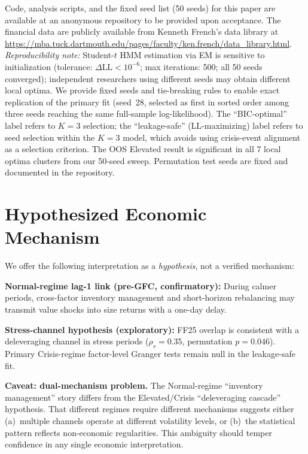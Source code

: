 \documentclass[sigconf,anonymous]{acmart}
\begin{document}
Code, analysis scripts, and the fixed seed list (50 seeds) for this paper are available at an anonymous repository to be provided upon acceptance. The financial data are publicly available from Kenneth French's data library at \url{https://mba.tuck.dartmouth.edu/pages/faculty/ken.french/data_library.html}. \emph{Reproducibility note:} Student-$t$ HMM estimation via EM is sensitive to initialization (tolerance: $\Delta\text{LL} < 10^{-6}$; max iterations: 500; all 50 seeds converged); independent researchers using different seeds may obtain different local optima. We provide fixed seeds and tie-breaking rules to enable exact replication of the primary fit (seed~28, selected as first in sorted order among three seeds reaching the same full-sample log-likelihood). The ``BIC-optimal'' label refers to $K = 3$ selection; the ``leakage-safe'' (LL-maximizing) label refers to seed selection within the $K = 3$ model, which avoids using crisis-event alignment as a selection criterion. The OOS Elevated result is significant in all 7 local optima clusters from our 50-seed sweep. Permutation test seeds are fixed and documented in the repository.

\appendix

\section{Hypothesized Economic Mechanism}
\label{app:mechanism}

We offer the following interpretation as a \emph{hypothesis}, not a verified mechanism:

\textbf{Normal-regime lag-1 link (pre-GFC, confirmatory):} During calmer periods,
cross-factor inventory management and short-horizon rebalancing may transmit
value shocks into size returns with a one-day delay.

\textbf{Stress-channel hypothesis (exploratory):} FF25 overlap is consistent with
a deleveraging channel in stress periods
($\rho_s = 0.35$, permutation $p = 0.046$). Primary Crisis-regime factor-level
Granger tests remain null in the leakage-safe fit.

\textbf{Caveat: dual-mechanism problem.} The Normal-regime ``inventory management''
story differs from the Elevated/Crisis ``deleveraging cascade'' hypothesis.
That different regimes require different mechanisms suggests either (a)~multiple
channels operate at different volatility levels, or (b)~the statistical pattern
reflects non-economic regularities. This ambiguity should temper confidence in
any single economic interpretation.
\end{document}
